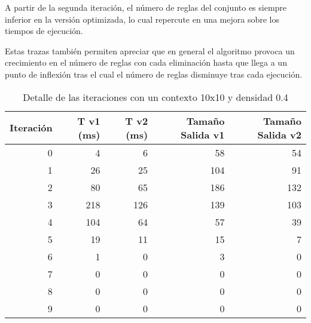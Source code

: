 	A partir de la segunda iteración, el número de reglas del conjunto es siempre inferior en la versión optimizada, lo cual repercute en una mejora sobre los tiempos de ejecución.
	
	Estas trazas también permiten apreciar que en general el algoritmo provoca un crecimiento en el número de reglas con cada eliminación hasta que llega a un punto de inflexión tras el cual el número de reglas disminuye tras cada ejecución. 
	
	\begin{table}[htbp]
		\caption{Detalle de las iteraciones con un contexto 10x10 y densidad 0.4}
		\begin{center}
			\begin{tabular}{|r|r|r|r|r|}
				\hline 
				Iteración  & T v1 (ms) & T v2 (ms) & Tamaño Salida v1  & Tamaño Salida v2  \\ \hline \hline
				0 & 4 & 6 & 58 & 54 \\ \hline
				1 & 26 & 25 & 104 & 91 \\ \hline
				2 & 80 & 65 & 186 & 132 \\ \hline
				3 & 218 & 126 & 139 & 103 \\ \hline
				4 & 104 & 64 & 57 & 39 \\ \hline
				5 & 19 & 11 & 15 & 7 \\ \hline
				6 & 1 & 0 & 3 & 0 \\ \hline
				7 & 0 & 0 & 0 & 0 \\ \hline
				8 & 0 & 0 & 0 & 0 \\ \hline
				9 & 0 & 0 & 0 & 0 \\ \hline
			\end{tabular}
		\end{center}
		\label{iteraciones10d4}
	\end{table}


